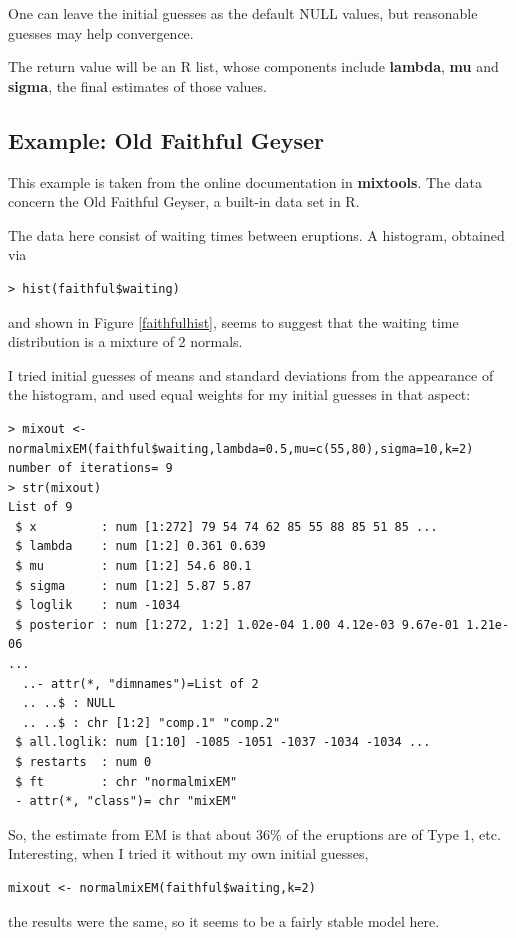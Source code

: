 One can leave the initial guesses as the default NULL values, but
reasonable guesses may help convergence.

The return value will be an R list, whose components include {\bf
lambda}, {\bf mu} and {\bf sigma}, the final estimates of those values.

\subsection{Example:  Old Faithful Geyser}

This example is taken from the online documentation in {\bf mixtools}.
The data concern the Old Faithful Geyser, a built-in data set in R.

The data here consist of waiting times between eruptions.  A histogram,
obtained via 

\begin{lstlisting}
> hist(faithful$waiting)
\end{lstlisting}

and shown in Figure \ref{faithfulhist}, seems to suggest that the
waiting time distribution is a mixture of 2 normals. 

I tried initial guesses of means and standard deviations from the
appearance of the histogram, and used equal weights for my initial
guesses in that aspect:

\begin{lstlisting}
> mixout <- normalmixEM(faithful$waiting,lambda=0.5,mu=c(55,80),sigma=10,k=2)
number of iterations= 9 
> str(mixout)
List of 9
 $ x         : num [1:272] 79 54 74 62 85 55 88 85 51 85 ...
 $ lambda    : num [1:2] 0.361 0.639
 $ mu        : num [1:2] 54.6 80.1
 $ sigma     : num [1:2] 5.87 5.87
 $ loglik    : num -1034
 $ posterior : num [1:272, 1:2] 1.02e-04 1.00 4.12e-03 9.67e-01 1.21e-06
...
  ..- attr(*, "dimnames")=List of 2
  .. ..$ : NULL
  .. ..$ : chr [1:2] "comp.1" "comp.2"
 $ all.loglik: num [1:10] -1085 -1051 -1037 -1034 -1034 ...
 $ restarts  : num 0
 $ ft        : chr "normalmixEM"
 - attr(*, "class")= chr "mixEM"
\end{lstlisting}

So, the estimate from EM is that about 36\% of the eruptions are of Type
1, etc.  Interesting, when I tried it without my own initial guesses,

\begin{lstlisting}
mixout <- normalmixEM(faithful$waiting,k=2)
\end{lstlisting}

the results were the same, so it seems to be a fairly stable model here.

